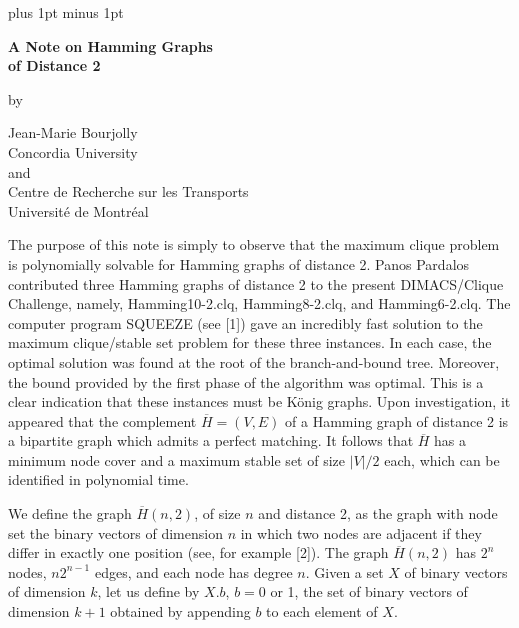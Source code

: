\textwidth=6in
\textheight=8in
\topmargin=0in
\oddsidemargin=1cm
\parindent=0pt
\parskip=8pt plus 1pt minus 1pt




\baselineskip=15pt
\pagestyle{plain}
\setcounter{page}{1}

\begin{center}
{\LARGE\bf A Note on Hamming Graphs \\
of Distance 2}

\vspace*{1cm}
by
\vspace*{1cm}

{\large Jean-Marie Bourjolly} \\
Concordia University \\
and \\
Centre de Recherche sur les Transports \\
Universit\'e de Montr\'eal
\end{center}

\vspace*{2cm}

The purpose of this note is simply to observe that the maximum clique problem is polynomially solvable for Hamming graphs of distance 2.
Panos Pardalos contributed three Hamming graphs of distance 2 to the present DIMACS/Clique Challenge, namely, Hamming10-2.clq, Hamming8-2.clq, and Hamming6-2.clq.
The computer program SQUEEZE (see [1]) gave an incredibly fast solution to the maximum clique/stable set problem for these three instances.
In each case, the optimal solution was found at the root of the branch-and-bound tree.
Moreover, the bound provided by the first phase of the algorithm was optimal.
This is a clear indication that these instances must be K\"onig graphs.
Upon investigation, it appeared that the complement $\overline H = (V,E)$ of a Hamming graph of distance 2 is a bipartite graph which admits a perfect matching.
It follows that $\overline H$ has a minimum node cover and a maximum stable set of size $|V|/2$ each, which can be identified in polynomial time.

We define the graph $\overline H (n,2)$, of size $n$ and distance 2, as the graph with node set the binary vectors of dimension $n$ in which two nodes are adjacent if they differ in exactly one position (see, for example [2]).
The graph $\overline H (n,2)$ has $2^n$ nodes, $n2^{n-1}$ edges, and each node has degree $n$.
Given a set $X$ of binary vectors of dimension $k$, let us define by $X.b$, $b=0$ or 1, the set of binary vectors of dimension $k+1$ obtained by appending $b$ to each element of $X$.

